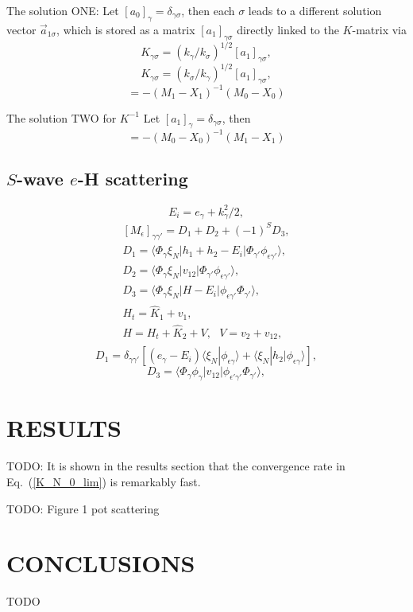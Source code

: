 \documentclass[aip
, pra
, showpacs
, aps
, twocolumn
, groupedaddress
, floatfix
]{revtex4}
\newcommand{\beq}{\begin{equation}}
\newcommand{\eeq}{\end{equation}}
\newcommand{\barr}{\begin{array}}
\newcommand{\earr}{\end{array}}
\begin{document}
The solution ONE:
Let $[a_0]_\gamma = \delta_{\gamma \sigma}$, then each $\sigma$ leads to a different solution vector $\vec{a}_{1\sigma}$, which is stored as a matrix $[a_1]_{\gamma \sigma}$ directly linked to the $K$-matrix via
\beq
K_{\gamma \sigma} = (k_\gamma / k_\sigma)^{1/2} [a_1]_{\gamma \sigma},
\eeq
\beq
K_{\gamma \sigma} = (k_\sigma / k_\gamma)^{1/2} [a_1]_{\gamma \sigma},
\eeq
\beq
[a_1]= - (M_{1} - X_{1} )^{-1}(M_{0} - X_{0} ) 
\eeq

The solution TWO for $K^{-1}$
Let $[a_1]_\gamma = \delta_{\gamma \sigma}$, then
\beq
[a_0]= - (M_{0} - X_{0} )^{-1}(M_{1} - X_{1} )
\eeq



\subsection{$S$-wave $e$-H scattering}
\beq
E_i = e_\gamma + k^2_\gamma/2,
\eeq
\beq \barr{l}
[M_{\epsilon}]_{\gamma \gamma'} = D_1 + D_2 + (-1)^S D_3,\\
D_1 = \langle \Phi_\gamma \xi_{N}  | h_1 + h_2-E_i |
\Phi_{\gamma'} \phi_{\epsilon \gamma'} \rangle, \\
D_2 = \langle \Phi_\gamma \xi_{N}  | v_{12} |
\Phi_{\gamma'} \phi_{\epsilon \gamma'} \rangle, \\
D_3 = \langle \Phi_\gamma \xi_{N}  | H -E_i |
\phi_{\epsilon \gamma'} \Phi_{\gamma'}  \rangle, \\
H_t = \hat{K}_1 + v_1, \\
H = H_t + \hat{K}_2 + V, \ \ \ V = v_2 + v_{12},\\
\earr \label{Y_B_W} \eeq
\beq
D_1 = \delta_{\gamma \gamma'} [ (e_\gamma -  E_i)
\langle \xi_N | \phi_{\epsilon \gamma} \rangle + \langle \xi_N | h_2|\phi_{\epsilon \gamma} \rangle],
\eeq
\beq
D_3 =  \langle \Phi_\gamma \phi_{\gamma}  | v_{12}|
\phi_{\epsilon' \gamma'} \Phi_{\gamma'}  \rangle ,
\label{eH_ex} \eeq







\section{RESULTS}
TODO: It is shown in the results section that the convergence rate in Eq.~(\ref{K_N_0_lim}) is remarkably fast.

TODO: Figure 1 pot scattering

\section{CONCLUSIONS}
TODO


\begin{acknowledgments}
\end{acknowledgments}





%
\end{document}
